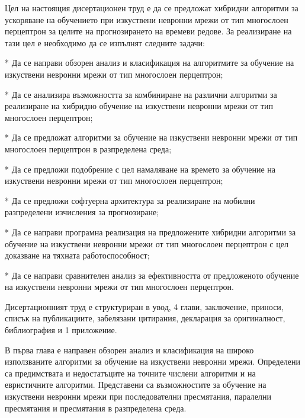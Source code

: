 Цел на настоящия дисертационен труд е да се предложат хибридни алгоритми за ускоряване на обучението при изкуствени невронни мрежи от тип многослоен перцептрон за целите на прогнозирането на времеви редове. За реализиране на тази цел е необходимо да се изпълнят следните задачи:

*	Да се направи обзорен анализ и класификация на алгоритмите за обучение на изкуствени невронни мрежи от тип многослоен перцептрон;

*	Да се анализира възможността за комбиниране на различни алгоритми за реализиране на хибридно обучение на изкуствени невронни мрежи от тип многослоен перцептрон;

*	Да се предложат алгоритми за обучение на изкуствени невронни мрежи от тип многослоен перцептрон в разпределена среда;

*	Да се предложи подобрение с цел намаляване на времето за обучение на изкуствени невронни мрежи от тип многослоен перцептрон;

*	Да се предложи софтуерна архитектура за реализиране на мобилни разпределени изчисления за прогнозиране;

*	Да се направи програмна реализация на предложените хибридни алгоритми за обучение на изкуствени невронни мрежи от тип многослоен перцептрон с цел доказване на тяхната работоспособност;

*	Да се направи сравнителен анализ за ефективността от предложеното обучение на изкуствени невронни мрежи от тип многослоен перцептрон.

Дисертационният труд е структуриран в увод, 4 глави, заключение, приноси, списък на публикациите, забелязани цитирания, декларация за оригиналност, библиография и 1 приложение.

В първа глава е направен обзорен анализ и класификация на широко използваните алгоритми за обучение на изкуствени невронни мрежи. Определени са предимствата и недостатъците на точните числени алгоритми и на евристичните алгоритми. Представени са възможностите за обучение на изкуствени невронни мрежи при последователни пресмятания, паралелни пресмятания и пресмятания в разпределена среда.

